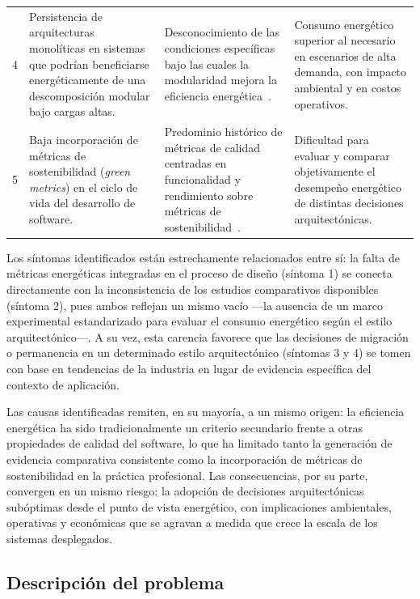 \begin{longtable}{@{}p{0.8cm}>{\raggedright\arraybackslash}p{4.2cm}>{\raggedright\arraybackslash}p{4.2cm}>{\raggedright\arraybackslash}p{4.2cm}@{}}
4 & Persistencia de arquitecturas monolíticas en sistemas que podrían beneficiarse energéticamente de una descomposición modular bajo cargas altas. & Desconocimiento de las condiciones específicas bajo las cuales la modularidad mejora la eficiencia energética~\cite{jagroep2017extending}. & Consumo energético superior al necesario en escenarios de alta demanda, con impacto ambiental y en costos operativos. \\[6pt]
5 & Baja incorporación de métricas de sostenibilidad (\textit{green metrics}) en el ciclo de vida del desarrollo de software. & Predominio histórico de métricas de calidad centradas en funcionalidad y rendimiento sobre métricas de sostenibilidad~\cite{marimuthu2017green}. & Dificultad para evaluar y comparar objetivamente el desempeño energético de distintas decisiones arquitectónicas. \\
\end{longtable}
\endgroup

Los síntomas identificados están estrechamente relacionados entre sí: la falta de métricas energéticas integradas en el proceso de diseño (síntoma 1) se conecta directamente con la inconsistencia de los estudios comparativos disponibles (síntoma 2), pues ambos reflejan un mismo vacío ---la ausencia de un marco experimental estandarizado para evaluar el consumo energético según el estilo arquitectónico---. A su vez, esta carencia favorece que las decisiones de migración o permanencia en un determinado estilo arquitectónico (síntomas 3 y 4) se tomen con base en tendencias de la industria en lugar de evidencia específica del contexto de aplicación.

Las causas identificadas remiten, en su mayoría, a un mismo origen: la eficiencia energética ha sido tradicionalmente un criterio secundario frente a otras propiedades de calidad del software, lo que ha limitado tanto la generación de evidencia comparativa consistente como la incorporación de métricas de sostenibilidad en la práctica profesional. Las consecuencias, por su parte, convergen en un mismo riesgo: la adopción de decisiones arquitectónicas subóptimas desde el punto de vista energético, con implicaciones ambientales, operativas y económicas que se agravan a medida que crece la escala de los sistemas desplegados.

\subsection{Descripción del problema}
\label{sec:narrativa}


